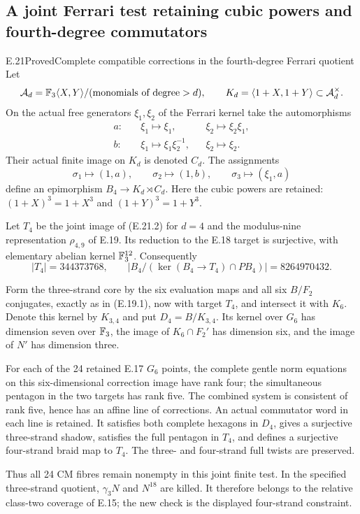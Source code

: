 \subsection{A joint Ferrari test retaining cubic powers and fourth-degree commutators}

\begin{statement}{E.21}{Proved}{Complete compatible corrections in the fourth-degree Ferrari quotient}
Let
\[
 \mathcal A_d=\mathbb F_3\langle X,Y\rangle/(\text{monomials of degree}>d),
 \qquad
 K_d=\langle1+X,1+Y\rangle\subset\mathcal A_d^\times.
\]
On the actual free generators $\xi_1,\xi_2$ of the
Ferrari kernel take the automorphisms
\[
 \begin{aligned}
 a:&\quad\xi_1\mapsto\xi_1,
           &&\xi_2\mapsto\xi_2\xi_1,\\
 b:&\quad\xi_1\mapsto\xi_1\xi_2^{-1},
           &&\xi_2\mapsto\xi_2.
 \end{aligned}
 \tag{E.21.1}
\]
Their actual finite image on $K_d$ is denoted $C_d$.
The assignments
\[
 \sigma_1\mapsto(1,a),\qquad
 \sigma_2\mapsto(1,b),\qquad
 \sigma_3\mapsto(\xi_1,a)
 \tag{E.21.2}
\]
define an epimorphism $B_4\to K_d\rtimes C_d$.
Here the cubic powers are retained:
$(1+X)^3=1+X^3$ and $(1+Y)^3=1+Y^3$.

Let $T_4$ be the joint image of (E.21.2) for $d=4$
and the modulus-nine representation $\rho_{4,9}$
of E.19. Its reduction to the E.18 target is
surjective, with elementary abelian kernel
$\mathbb F_3^{12}$. Consequently
\[
 |T_4|=344373768,
 \qquad
 |B_4/(\ker(B_4\to T_4)\cap PB_4)|=8264970432.
 \tag{E.21.3}
\]

Form the three-strand core by the six evaluation
maps and all six $B/F_2$ conjugates, exactly as
in (E.19.1), now with target $T_4$, and intersect
it with $K_6$. Denote this kernel by $K_{3,4}$
and put $D_4=B/K_{3,4}$. Its kernel over $G_6$
has dimension seven over $\mathbb F_3$, the image of
$K_6\cap F_2'$ has dimension six, and the image
of $N'$ has dimension three.

For each of the 24 retained E.17 $G_6$ points,
the complete gentle norm equations on this
six-dimensional correction image have rank
four; the simultaneous pentagon in the two
targets has rank five. The combined system
is consistent of rank five, hence has an
affine line of corrections. An actual
commutator word in each line is retained.
It satisfies both complete hexagons in
$D_4$, gives a surjective three-strand
shadow, satisfies the full pentagon in
$T_4$, and defines a surjective four-strand
braid map to $T_4$. The three- and
four-strand full twists are preserved.

Thus all 24 CM fibres remain nonempty in
this joint finite test. In the specified
three-strand quotient, $\gamma_3N$ and
$N^{18}$ are killed. It therefore belongs
to the relative class-two coverage of
E.15; the new check is the displayed
four-strand constraint.
\end{statement}

